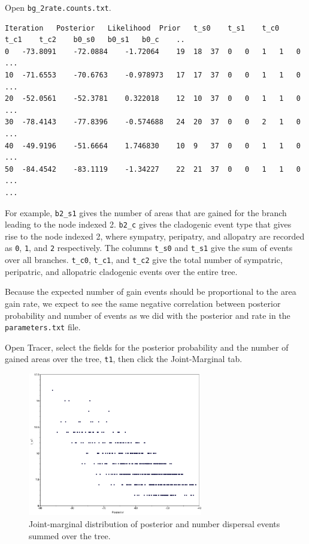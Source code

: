 \documentclass[11pt]{article}
\begin{document}
Open {\tt bg\_2rate.counts.txt}.

\begin{framed}
\begin{lstlisting}[basicstyle=\tiny \listingsfont, columns=texcl]
Iteration	Posterior	Likelihood	Prior	t_s0	t_s1	t_c0	t_c1	t_c2	b0_s0	b0_s1	b0_c	..
0	-73.8091	-72.0884	-1.72064	19	18	37	0	0	1	1	0	...
10	-71.6553	-70.6763	-0.978973	17	17	37	0	0	1	1	0	...
20	-52.0561	-52.3781	0.322018	12	10	37	0	0	1	1	0	...
30	-78.4143	-77.8396	-0.574688	24	20	37	0	0	2	1	0	...
40	-49.9196	-51.6664	1.746830	10	9	37	0	0	1	1	0	...
50	-84.4542	-83.1119	-1.34227	22	21	37	0	0	1	1	0	...
...
\end{lstlisting}
\end{framed}

For example, {\tt b2\_s1} gives the number of areas that are gained for the branch leading to the node indexed 2.
{\tt b2\_c} gives the cladogenic event type that gives rise to the node indexed 2, where sympatry, peripatry, and allopatry are recorded as {\tt 0}, {\tt 1}, and {\tt 2} respectively. The columns {\tt t\_s0} and {\tt t\_s1} give the sum of events over all branches. {\tt t\_c0}, {\tt t\_c1}, and {\tt t\_c2} give the total number of sympatric, peripatric, and allopatric cladogenic events over the entire tree.

Because the expected number of gain events should be proportional to the area gain rate, we expect to see the same negative correlation between posterior probability and number of events as we did with the posterior and rate in the {\tt parameters.txt} file.

Open Tracer, select the fields for the posterior probability and the number of gained areas over the tree, {\tt t1}, then click the Joint-Marginal tab.

\begin{figure}[H]
\centering
\includegraphics[width=3in]{figures/joint_ngain_posterior}
\caption{Joint-marginal distribution of posterior and number dispersal events summed over the tree.}
\end{figure}
\end{document}
